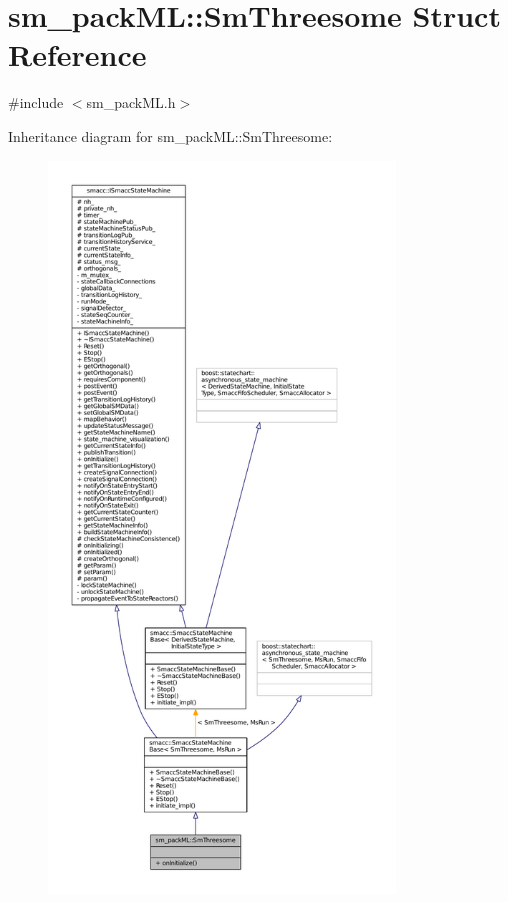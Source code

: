 \hypertarget{structsm__packML_1_1SmThreesome}{}\section{sm\+\_\+pack\+ML\+:\+:Sm\+Threesome Struct Reference}
\label{structsm__packML_1_1SmThreesome}


{\ttfamily \#include $<$sm\+\_\+pack\+M\+L.\+h$>$}



Inheritance diagram for sm\+\_\+pack\+ML\+:\+:Sm\+Threesome\+:
\nopagebreak
\begin{figure}[H]
\begin{center}
\leavevmode
\includegraphics[height=550pt]{structsm__packML_1_1SmThreesome__inherit__graph}
\end{center}
\end{figure}


